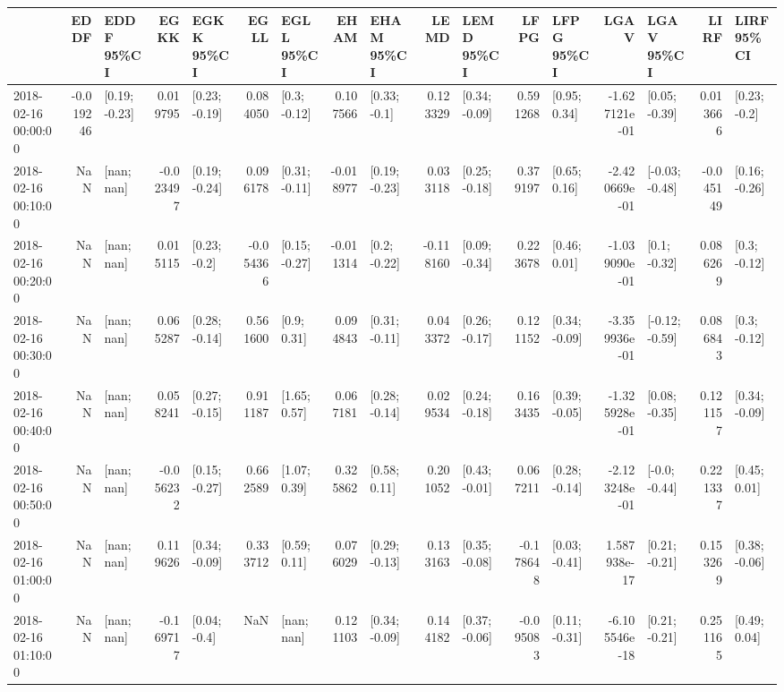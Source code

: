\begin{tabular}{lrlrlrlrlrlrlrlrl}
\toprule
{} &      EDDF &      EDDF 95\%CI &      EGKK &      EGKK 95\%CI &      EGLL &      EGLL 95\%CI &      EHAM &      EHAM 95\%CI &      LEMD &      LEMD 95\%CI &      LFPG &      LFPG 95\%CI &          LGAV &      LGAV 95\%CI &      LIRF &      LIRF 95\%CI \\
\midrule
2018-02-16 00:00:00 & -0.019246 &   [0.19; -0.23] &  0.019795 &   [0.23; -0.19] &  0.084050 &    [0.3; -0.12] &  0.107566 &    [0.33; -0.1] &  0.123329 &   [0.34; -0.09] &  0.591268 &    [0.95; 0.34] & -1.627121e-01 &   [0.05; -0.39] &  0.013666 &    [0.23; -0.2] \\
2018-02-16 00:10:00 &       NaN &      [nan; nan] & -0.023497 &   [0.19; -0.24] &  0.096178 &   [0.31; -0.11] & -0.018977 &   [0.19; -0.23] &  0.033118 &   [0.25; -0.18] &  0.379197 &    [0.65; 0.16] & -2.420669e-01 &  [-0.03; -0.48] & -0.045149 &   [0.16; -0.26] \\
2018-02-16 00:20:00 &       NaN &      [nan; nan] &  0.015115 &    [0.23; -0.2] & -0.054366 &   [0.15; -0.27] & -0.011314 &    [0.2; -0.22] & -0.118160 &   [0.09; -0.34] &  0.223678 &    [0.46; 0.01] & -1.039090e-01 &    [0.1; -0.32] &  0.086269 &    [0.3; -0.12] \\
2018-02-16 00:30:00 &       NaN &      [nan; nan] &  0.065287 &   [0.28; -0.14] &  0.561600 &     [0.9; 0.31] &  0.094843 &   [0.31; -0.11] &  0.043372 &   [0.26; -0.17] &  0.121152 &   [0.34; -0.09] & -3.359936e-01 &  [-0.12; -0.59] &  0.086843 &    [0.3; -0.12] \\
2018-02-16 00:40:00 &       NaN &      [nan; nan] &  0.058241 &   [0.27; -0.15] &  0.911187 &    [1.65; 0.57] &  0.067181 &   [0.28; -0.14] &  0.029534 &   [0.24; -0.18] &  0.163435 &   [0.39; -0.05] & -1.325928e-01 &   [0.08; -0.35] &  0.121157 &   [0.34; -0.09] \\
2018-02-16 00:50:00 &       NaN &      [nan; nan] & -0.056232 &   [0.15; -0.27] &  0.662589 &    [1.07; 0.39] &  0.325862 &    [0.58; 0.11] &  0.201052 &   [0.43; -0.01] &  0.067211 &   [0.28; -0.14] & -2.123248e-01 &   [-0.0; -0.44] &  0.221337 &    [0.45; 0.01] \\
2018-02-16 01:00:00 &       NaN &      [nan; nan] &  0.119626 &   [0.34; -0.09] &  0.333712 &    [0.59; 0.11] &  0.076029 &   [0.29; -0.13] &  0.133163 &   [0.35; -0.08] & -0.178648 &   [0.03; -0.41] &  1.587938e-17 &   [0.21; -0.21] &  0.153269 &   [0.38; -0.06] \\
2018-02-16 01:10:00 &       NaN &      [nan; nan] & -0.169717 &    [0.04; -0.4] &       NaN &      [nan; nan] &  0.121103 &   [0.34; -0.09] &  0.144182 &   [0.37; -0.06] & -0.095083 &   [0.11; -0.31] & -6.105546e-18 &   [0.21; -0.21] &  0.251165 &    [0.49; 0.04] \\

\end{tabular}
